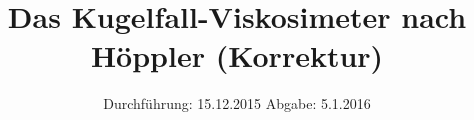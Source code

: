 

\subject{VERSUCH NUMMER 107 (Korrektur)}
\title{Das Kugelfall-Viskosimeter nach Höppler (Korrektur)}
\date{
  Durchführung: 15.12.2015
  \hspace{3em}
  Abgabe:  5.1.2016
}



\maketitle
\thispagestyle{empty}
\tableofcontents
\newpage







\printbibliography


